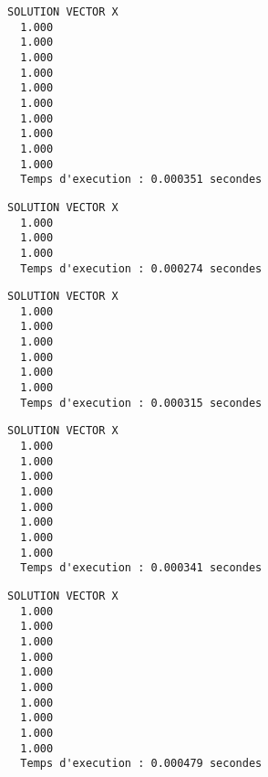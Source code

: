 \begin{lstlisting}[caption={$A_8X=B$} results, basicstyle=\fontsize{5}{8}\selectfont]
                  SOLUTION VECTOR X 
  1.000   
  1.000   
  1.000   
  1.000   
  1.000   
  1.000   
  1.000   
  1.000   
  1.000   
  1.000   
  Temps d'execution : 0.000351 secondes
\end{lstlisting}

\begin{lstlisting}[caption={$A_9X=B$} results, basicstyle=\fontsize{8}{10}\selectfont]
                  SOLUTION VECTOR X 
  1.000   
  1.000   
  1.000   
  Temps d'execution : 0.000274 secondes
\end{lstlisting}

\begin{lstlisting}[caption={$A_{10}X=B$} results, basicstyle=\fontsize{8}{10}\selectfont]
                  SOLUTION VECTOR X 
  1.000   
  1.000   
  1.000   
  1.000   
  1.000   
  1.000   
  Temps d'execution : 0.000315 secondes
\end{lstlisting}

\begin{lstlisting}[caption={$A_{11}X=B$} results, basicstyle=\fontsize{5}{8}\selectfont]
                  SOLUTION VECTOR X 
  1.000   
  1.000   
  1.000   
  1.000   
  1.000   
  1.000   
  1.000   
  1.000   
  Temps d'execution : 0.000341 secondes
\end{lstlisting}

\begin{lstlisting}[caption={$A_{12}X=B$} results, basicstyle=\fontsize{5}{8}\selectfont]
                  SOLUTION VECTOR X 
  1.000   
  1.000   
  1.000   
  1.000   
  1.000   
  1.000   
  1.000   
  1.000   
  1.000   
  1.000   
  Temps d'execution : 0.000479 secondes
\end{lstlisting}
% 

